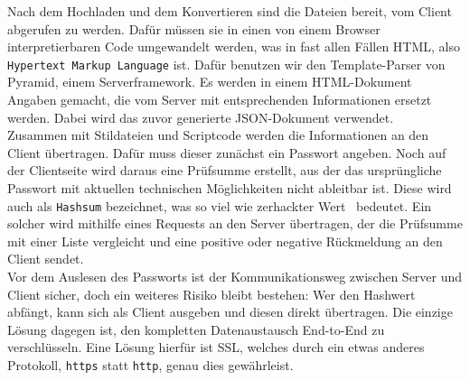 Nach dem Hochladen und dem Konvertieren sind die Dateien bereit, vom Client abgerufen zu werden. Dafür müssen sie in einen von einem Browser interpretierbaren Code umgewandelt werden, was in fast allen Fällen HTML, also \texttt{Hypertext Markup Language} ist. Dafür benutzen wir den Template-Parser von Pyramid, einem Serverframework. Es werden in einem HTML-Dokument Angaben gemacht, die vom Server mit entsprechenden Informationen ersetzt werden. Dabei wird das zuvor generierte JSON-Dokument verwendet.\\

Zusammen mit Stildateien und Scriptcode werden die Informationen an den Client übertragen. Dafür muss dieser zunächst ein Passwort angeben. Noch auf der Clientseite wird daraus eine Prüfsumme erstellt, aus der das ursprüngliche Passwort mit aktuellen technischen Möglichkeiten nicht ableitbar ist. Diese wird auch als \texttt{Hashsum} bezeichnet, was so viel wie \glqq zerhackter Wert \grqq\ bedeutet. Ein solcher wird mithilfe eines Requests an den Server übertragen, der die Prüfsumme mit einer Liste vergleicht und eine positive oder negative Rückmeldung an den Client sendet.\\

Vor dem Auslesen des Passworts ist der Kommunikationsweg zwischen Server und Client sicher, doch ein weiteres Risiko bleibt bestehen: Wer den Hashwert abfängt, kann sich als Client ausgeben und diesen direkt übertragen. Die einzige Lösung dagegen ist, den kompletten Datenaustausch End-to-End zu verschlüsseln. Eine Lösung hierfür ist SSL, welches durch ein etwas  anderes Protokoll, \texttt{https} statt \texttt{http}, genau dies gewährleist.